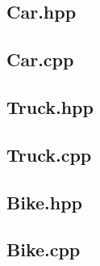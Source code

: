\documentclass[12pt,naustrian,a4widepaper]{scrartcl}
\begin{document}
\subsection{Car.hpp}


\subsection{Car.cpp}


\subsection{Truck.hpp}


\subsection{Truck.cpp}


\subsection{Bike.hpp}


\subsection{Bike.cpp}


%


\end{document}

